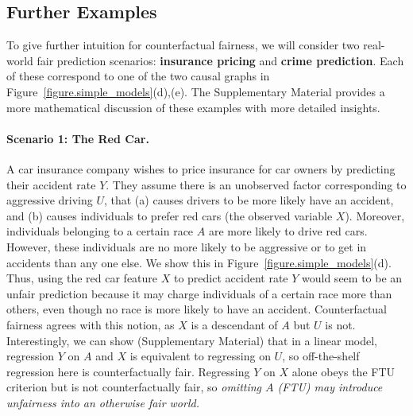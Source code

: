\subsection{Further Examples}
\label{sec:further_examples}

To give further intuition for counterfactual fairness, we will consider
two real-world fair prediction scenarios: \textbf{insurance pricing}
and \textbf{crime prediction}. Each of these correspond to one of the
two causal graphs in Figure~\ref{figure.simple_models}(d),(e). The
Supplementary Material provides a more mathematical discussion of
these examples with more detailed insights.

\paragraph{Scenario 1: The Red Car.}
A car insurance company wishes to price insurance for car
owners by predicting their accident rate $Y$. They assume there is an
unobserved factor corresponding to aggressive driving $U$, that (a)
causes drivers to be more likely have an accident, and (b) causes
individuals to prefer red cars (the observed variable $X$). Moreover,
individuals belonging to a certain race $A$ are more likely to drive
red cars. However, these individuals are no more likely to be
aggressive or to get in accidents than any one else. We show this in
Figure~\ref{figure.simple_models}(d). Thus, using the
red car feature $X$ to predict accident rate $Y$ would seem to be an
unfair prediction because it may charge individuals of a certain race
more than others, even though no race is more likely to have an
accident. Counterfactual fairness agrees with this notion, as $X$
is a descendant of $A$ but $U$ is not. Interestingly, we can show
(Supplementary Material) that in a linear model, regression $Y$ on $A$
and $X$ is equivalent to regressing on $U$, so off-the-shelf
regression here is counterfactually fair. Regressing $Y$ on $X$ alone
obeys the FTU criterion but is not counterfactually fair, so
{\em omitting $A$ (FTU) may introduce unfairness into
  an otherwise fair world.}
%
